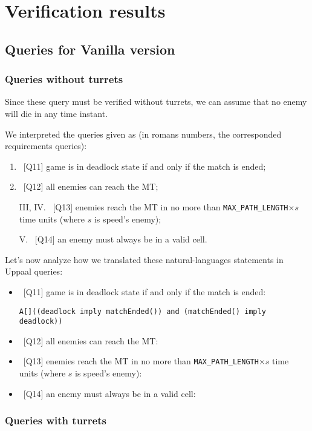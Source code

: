\documentclass[
10pt, %
a4paper, %
oneside, %
headinclude,footinclude, %
BCOR5mm, %
]{scrartcl}
\begin{document}
	\section{Verification results}
	\subsection{Queries for Vanilla version}
	\subsubsection{Queries without turrets}
	Since these query must be verified without turrets, we can assume that no enemy will die in any time instant.
	
	We interpreted the queries given as (in romans numbers, the corresponded requirements queries):
		\begin{enumerate}[label=\Roman*.]
			\item~[Q11] game is in deadlock state if and only if the match is ended;
			\item~[Q12] all enemies can reach the MT;
			\item[III, IV.]~[Q13] enemies reach the MT in no more than \texttt{MAX\_PATH\_LENGTH}$\times s$ time units (where $s$ is speed's enemy);
			\item[V.]~[Q14] an enemy must always be in a valid cell.
		\end{enumerate}
	
	Let's now analyze how we translated these natural-languages statements in Uppaal queries:
	\begin{itemize}
		\item~[Q11] game is in deadlock state if and only if the match is ended:
		
			\texttt{A[]((deadlock imply matchEnded()) and (matchEnded() imply deadlock))}
			
			
		\item~[Q12] all enemies can reach the MT:
		\item~[Q13] enemies reach the MT in no more than \texttt{MAX\_PATH\_LENGTH}$\times s$ time units (where $s$ is speed's enemy):
		\item~[Q14] an enemy must always be in a valid cell:
	\end{itemize}
	
		
	
	\subsubsection{Queries with turrets}
\end{document}
